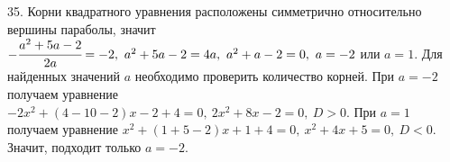 35. Корни квадратного уравнения расположены симметрично относительно вершины параболы, значит $-\cfrac{a^2+5a-2}{2a}=-2,\ a^2+5a-2=4a,\ a^2+a-2=0,\ a=-2$ или $a=1.$ Для найденных значений $a$ необходимо проверить количество корней. При $a=-2$ получаем уравнение $-2x^2+(4-10-2)x-2+4=0,\ 2x^2+8x-2=0,\ D>0.$ При $a=1$ получаем уравнение $x^2+(1+5-2)x+1+4=0,\ x^2+4x+5=0,\ D<0.$ Значит, подходит только $a=-2.$\\
